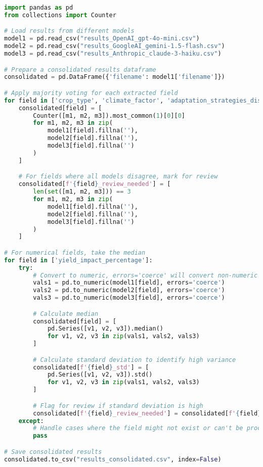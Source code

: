 \begin{commandbox}
\begin{lstlisting}[language=Python]
import pandas as pd
from collections import Counter

# Load results from different models
model1 = pd.read_csv("results_OpenAI_gpt-4o-mini.csv")
model2 = pd.read_csv("results_GoogleAI_gemini-1.5-flash.csv")
model3 = pd.read_csv("results_Anthropic_claude-3-haiku.csv")

# Prepare a consolidated results dataframe
consolidated = pd.DataFrame({'filename': model1['filename']})

# Apply majority voting for each extracted field
for field in ['crop_type', 'climate_factor', 'adaptation_strategies_discussed']:
    consolidated[field] = [
        Counter([m1, m2, m3]).most_common(1)[0][0]
        for m1, m2, m3 in zip(
            model1[field].fillna(''),
            model2[field].fillna(''),
            model3[field].fillna('')
        )
    ]

    # For fields where all models disagree, mark for review
    consolidated[f'{field}_review_needed'] = [
        len(set([m1, m2, m3])) == 3
        for m1, m2, m3 in zip(
            model1[field].fillna(''),
            model2[field].fillna(''),
            model3[field].fillna('')
        )
    ]

# For numerical fields, take the median
for field in ['yield_impact_percentage']:
    try:
        # Convert to numeric, errors='coerce' will convert non-numeric to NaN
        vals1 = pd.to_numeric(model1[field], errors='coerce')
        vals2 = pd.to_numeric(model2[field], errors='coerce')
        vals3 = pd.to_numeric(model3[field], errors='coerce')

        # Calculate median
        consolidated[field] = [
            pd.Series([v1, v2, v3]).median()
            for v1, v2, v3 in zip(vals1, vals2, vals3)
        ]

        # Calculate standard deviation to identify high variance
        consolidated[f'{field}_std'] = [
            pd.Series([v1, v2, v3]).std()
            for v1, v2, v3 in zip(vals1, vals2, vals3)
        ]

        # Flag for review if standard deviation is high
        consolidated[f'{field}_review_needed'] = consolidated[f'{field}_std'] > 2.0
    except:
        # Handle cases where the field might not exist or can't be processed
        pass

# Save consolidated results
consolidated.to_csv("results_consolidated.csv", index=False)
\end{lstlisting}
\end{commandbox}

